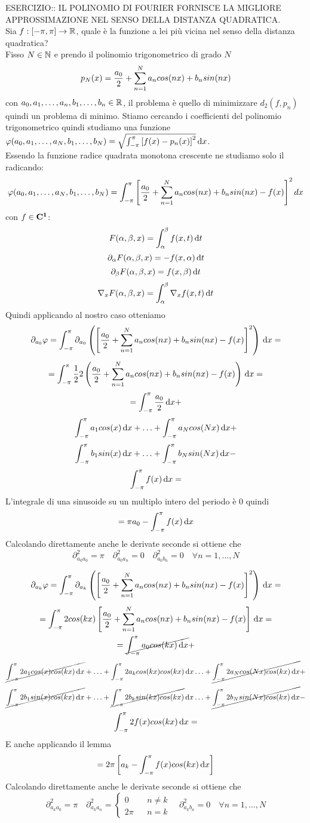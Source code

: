 ESERCIZIO:: IL POLINOMIO DI FOURIER FORNISCE LA MIGLIORE APPROSSIMAZIONE NEL SENSO DELLA DISTANZA QUADRATICA.\\
Sia $f: \left[-\pi,\pi\right] \to \mathbb{R}$, quale è la funzione a lei più vicina nel senso della distanza quadratica?\\
Fisso $N\in\mathbb{N}$ e prendo il polinomio trigonometrico di grado $N$
\[p_N(x)=\frac{a_0}{2}+\sum\limits_{n=1}^{N}a_{n}cos(nx)+b_{n}sin(nx)\]
con $a_0,a_1,\dotsc,a_n,b_1,\dotsc,b_n\in \mathbb{R}$, il problema è quello di minimizzare $d_2(f,p_n)$ quindi un problema di minimo. Stiamo cercando i coefficienti del polinomio trigonometrico quindi studiamo una funzione $\varphi(a_0,a_1,\dotsc,a_N,b_1,\dotsc,b_N) = \sqrt{\int_{-\pi}^{\pi}\left[f(x)-p_n(x)\right]^2}\,\mathrm{d}{x}$.\\
Essendo la funzione radice quadrata monotona crescente ne studiamo solo il radicando:
\[\varphi(a_0,a_1,\dotsc,a_N,b_1,\dotsc,b_N)=\int_{-\pi}^{\pi}\left[\frac{a_0}{2}+\sum\limits_{n=1}^{N}a_{n}cos(nx)+b_{n}sin(nx)-f(x)\right]^2dx\]
\observation
con $f\in \mathbf{C^{1}}$:
\[F(\alpha,\beta,x)=\int_{\alpha}^{\beta}f(x,t)\,\mathrm{d}{t}\]
\[\partial_\alpha F(\alpha,\beta,x)=-f(x,\alpha)\,\mathrm{d}{t}\]
\[\partial_\beta F(\alpha,\beta,x)=f(x,\beta)\,\mathrm{d}{t}\]
\[\nabla_x F(\alpha,\beta,x)=\int_{\alpha}^{\beta}\nabla_xf(x,t)\,\mathrm{d}{t}\]
Quindi applicando al nostro caso otteniamo
\[\partial_{a_0}\varphi = \int_{-\pi}^{\pi}\partial_{a_0}\left(\left[\frac{a_0}{2}+\sum\limits_{n=1}^{N}a_{n}cos(nx)+b_{n}sin(nx)-f(x)\right]^2\right)\,\mathrm{d}{x}=\]
\[ = \int_{-\pi}^{\pi} \frac{1}{2}2\left(\frac{a_0}{2}+\sum\limits_{n=1}^{N}a_{n}cos(nx)+b_{n}sin(nx)-f(x)\right)\,\mathrm{d}{x}=\]
\[ =  \int_{-\pi}^{\pi} \frac{a_0}{2}\,\mathrm{d}{x} + \]
\[\int_{-\pi}^{\pi} a_1cos(x)\,\mathrm{d}{x} +
\ldots +
\int_{-\pi}^{\pi} a_N cos(Nx)\,\mathrm{d}{x} + \]
\[\int_{-\pi}^{\pi} b_1sin(x)\,\mathrm{d}{x} +
\ldots +
\int_{-\pi}^{\pi} b_N sin(Nx)\,\mathrm{d}{x} - \]
\[ \int_{-\pi}^{\pi} f(x)\,\mathrm{d}{x} = \]
L'integrale di una sinusoide su un multiplo intero del periodo è $0$ quindi
\[=\pi a_0-\int_{-\pi}^{\pi}f(x)\,\mathrm{d}{x}\]
Calcolando direttamente anche le derivate seconde si ottiene che
\[\partial^2_{a_0a_0}=\pi\quad\partial^2_{a_0a_n}=0\quad\partial^2_{a_0b_n}=0\quad\forall n=1,\dotsc,N\]

\[\partial_{a_k}\varphi = \int_{-\pi}^{\pi}\partial_{a_k}\left(\left[\frac{a_0}{2}+\sum\limits_{n=1}^{N}a_{n}cos(nx)+b_{n}sin(nx)-f(x)\right]^2\right)\,\mathrm{d}{x}=\]
\[ = \int_{-\pi}^{\pi} 2cos(kx) \left[\frac{a_0}{2}+\sum\limits_{n=1}^{N}a_{n}cos(nx)+b_{n}sin(nx)-f(x)\right]\,\mathrm{d}{x}=\]
\[ =  \cancel{\int_{-\pi}^{\pi} a_0cos(kx)\,\mathrm{d}{x}} + \]
\[\cancel{\int_{-\pi}^{\pi} 2a_1cos(x)cos(kx)\,\mathrm{d}{x}} +
\ldots +
\int_{-\pi}^{\pi} 2a_k cos(kx)cos(kx)\,\mathrm{d}{x}
\ldots +
\cancel{\int_{-\pi}^{\pi} 2a_N cos(Nx)cos(kx)\,\mathrm{d}{x}} + \]
\[\cancel{\int_{-\pi}^{\pi} 2b_1sin(x)cos(kx)\,\mathrm{d}{x}} +
\ldots +
\cancel{\int_{-\pi}^{\pi} 2b_k sin(kx)cos(kx)}\,\mathrm{d}{x}
\ldots +
\cancel{\int_{-\pi}^{\pi} 2b_N sin(Nx)cos(kx)\,\mathrm{d}{x}} - \]
\[\int_{-\pi}^{\pi} 2f(x)cos(kx)\,\mathrm{d}{x} = \]
E anche applicando il lemma
\[=2\pi\left[a_k-\int_{-\pi}^{\pi}f(x)cos(kx)\,\mathrm{d}{x}\right]\]
Calcolando direttamente anche le derivate seconde si ottiene che
\[\partial^2_{a_ka_0}=\pi\quad\partial^2_{a_ka_n}=
\left\{\begin{matrix}
0&&n\ne k\\2\pi&&n=k
\end{matrix}\right.
\quad\partial^2_{a_kb_n}=0\quad\forall n=1,\dotsc,N\]

